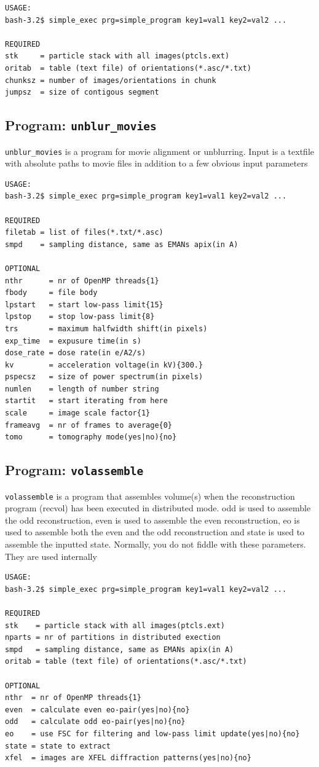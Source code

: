 \documentclass[a4paper,11pt]{article}
\newcommand{\prgname}[1]{\textcolor{NavyBlue}{\texttt{#1}}}
\begin{document}
\begin{verbatim}
USAGE:
bash-3.2$ simple_exec prg=simple_program key1=val1 key2=val2 ...

REQUIRED
stk     = particle stack with all images(ptcls.ext)
oritab  = table (text file) of orientations(*.asc/*.txt)
chunksz = number of images/orientations in chunk
jumpsz  = size of contigous segment
\end{verbatim}

\subsection{Program: \prgname{unblur\_movies}}
\label{unblur_movies}
\prgname{unblur\_movies} is a program for movie alignment or unblurring. Input is a textfile with absolute paths to movie files in addition to a few obvious input parameters

\begin{verbatim}
USAGE:
bash-3.2$ simple_exec prg=simple_program key1=val1 key2=val2 ...

REQUIRED
filetab = list of files(*.txt/*.asc)
smpd    = sampling distance, same as EMANs apix(in A)

OPTIONAL
nthr      = nr of OpenMP threads{1}
fbody     = file body
lpstart   = start low-pass limit{15}
lpstop    = stop low-pass limit{8}
trs       = maximum halfwidth shift(in pixels)
exp_time  = expusure time(in s)
dose_rate = dose rate(in e/A2/s)
kv        = acceleration voltage(in kV){300.}
pspecsz   = size of power spectrum(in pixels)
numlen    = length of number string
startit   = start iterating from here
scale     = image scale factor{1}
frameavg  = nr of frames to average{0}
tomo      = tomography mode(yes|no){no}
\end{verbatim}

\subsection{Program: \prgname{volassemble}}
\label{volassemble}
\prgname{volassemble} is a program that assembles volume(s) when the reconstruction program (recvol) has been executed in distributed mode. odd is used to assemble the odd reconstruction, even is used to assemble the even reconstruction, eo is used to assemble both the even and the odd reconstruction and state is used to assemble the inputted state. Normally, you do not fiddle with these parameters. They are used internally

\begin{verbatim}
USAGE:
bash-3.2$ simple_exec prg=simple_program key1=val1 key2=val2 ...

REQUIRED
stk    = particle stack with all images(ptcls.ext)
nparts = nr of partitions in distributed exection
smpd   = sampling distance, same as EMANs apix(in A)
oritab = table (text file) of orientations(*.asc/*.txt)

OPTIONAL
nthr  = nr of OpenMP threads{1}
even  = calculate even eo-pair(yes|no){no}
odd   = calculate odd eo-pair(yes|no){no}
eo    = use FSC for filtering and low-pass limit update(yes|no){no}
state = state to extract
xfel  = images are XFEL diffraction patterns(yes|no){no}
\end{verbatim}
\end{document}
